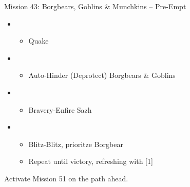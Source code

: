 \begin{battle}{{Mission 43: Borgbears, Goblins \& Munchkins -- Pre-Empt}}
	\begin{itemize}
		\item \second
			\begin{itemize}
				\item Quake
			\end{itemize}
		\item \sixth
			\begin{itemize}
				\item Auto-Hinder (Deprotect) Borgbears \& Goblins
			\end{itemize}
		\item \fourth
			\begin{itemize}
				\item Bravery-Enfire Sazh
			\end{itemize}
		\item \second
			\begin{itemize}
				\item Blitz-Blitz, prioritze Borgbear
				\item Repeat until victory, refreshing with [1]
			\end{itemize}
	\end{itemize}
\end{battle}

Activate Mission 51 on the path ahead.

